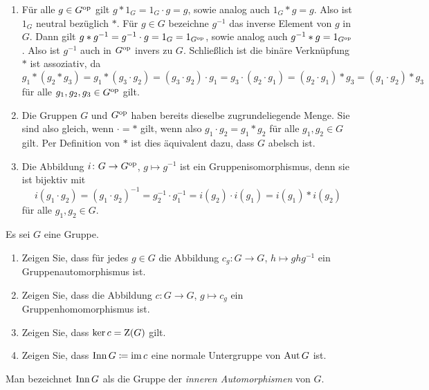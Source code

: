 \begin{solution}
  \begin{enumerate}
    \item
      Für alle $g \in G^{\operatorname{op}}$ gilt $g * 1_G = 1_G \cdot g = g$, sowie analog auch $1_G * g = g$.
      Also ist $1_G$ neutral bezüglich $*$.
      Für $g \in G$ bezeichne $g^{-1}$ das inverse Element von $g$ in $G$.
      Dann gilt $g * g^{-1} = g^{-1} \cdot g = 1_G = 1_{G^{\operatorname{op}}}$, sowie analog auch $g^{-1} * g = 1_{G^{\operatorname{op}}}$.
      Also ist $g^{-1}$ auch in $G^{\operatorname{op}}$ invers zu $G$.
      Schließlich ist die binäre Verknüpfung $*$ ist assoziativ, da
      \[
          g_1 * (g_2 * g_3)
        = g_1 * (g_3 \cdot g_2)
        = (g_3 \cdot g_2) \cdot g_1
        = g_3 \cdot (g_2 \cdot g_1)
        = (g_2 \cdot g_1) * g_3
        = (g_1 \cdot g_2) * g_3
      \]
      für alle $g_1, g_2, g_3 \in G^{\operatorname{op}}$ gilt.
    \item
      Die Gruppen $G$ und $G^{\operatorname{op}}$ haben bereits dieselbe zugrundeliegende Menge.
      Sie sind also gleich, wenn $\cdot = *$ gilt, wenn also $g_1 \cdot g_2 = g_1 * g_2$ für alle $g_1, g_2 \in G$ gilt.
      Per Definition von $*$ ist dies äquivalent dazu, dass $G$ abelsch ist.
    \item
      Die Abbildung $i \colon G \to G^{\operatorname{op}}$, $g \mapsto g^{-1}$ ist ein Gruppenisomorphismus, denn sie ist bijektiv mit
      \[
          i(g_1 \cdot g_2)
        = (g_1 \cdot g_2)^{-1}
        = g_2^{-1} \cdot g_1^{-1}
        = i(g_2) \cdot i(g_1)
        = i(g_1) * i(g_2)
      \]
      für alle $g_1, g_2 \in G$.
  \end{enumerate}
\end{solution}


\begin{question}[subtitle = Innere Automorphismen]
  \label{question: inner automorphims}
  Es sei $G$ eine Gruppe.
  \begin{enumerate}
    \item
      Zeigen Sie, dass für jedes $g \in G$ die Abbildung $c_g \colon G \to G$, $h \mapsto g h g^{-1}$ ein Gruppenautomorphismus ist.
    \item
      Zeigen Sie, dass die Abbildung $c \colon G \to G$, $g \mapsto c_g$ ein Gruppenhomomorphismus ist.
    \item
      Zeigen Sie, dass $\ker c = \operatorname{Z}(G)$ gilt.
    \item
      Zeigen Sie, dass $\operatorname{Inn} G \coloneqq \operatorname{im} c$ eine normale Untergruppe von $\operatorname{Aut} G$ ist.
  \end{enumerate}
  Man bezeichnet $\operatorname{Inn} G$ als die Gruppe der \emph{inneren Automorphismen} von $G$.
\end{question}


